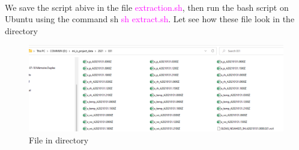 \paragraph{}
We save the script abive in the file \textcolor{magenta}{\scriptsize{extraction.sh}}, then run the bash script on Ubuntu using the command sh \textcolor{magenta}{\scriptsize{ sh extract.sh}}.
\newline
Let see how these file look in the directory
\begin{figure}[H]
\begin{center}
\includegraphics[scale=0.6]{csv2.png} %
\end{center}
\caption{File in directory}
\label{File in directory}%
\end{figure}








